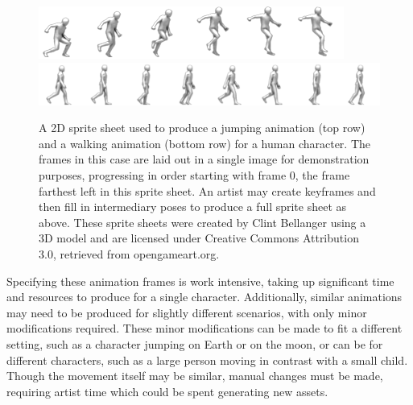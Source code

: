 \begin{figure}[htp]
    \centering
    \includegraphics[width=\textwidth]{images/sprite_example/platformer_sprites_jump.png}
    \includegraphics[width=\textwidth]{images/sprite_example/platformer_sprites_walk.png}
    \caption[Example of a 2D Sprite Animation]{A 2D sprite sheet used to produce a jumping animation (top row) and a walking animation (bottom row) for a human character.  The frames in this case are laid out in a single image for demonstration purposes, progressing in order starting with frame 0, the frame farthest left in this sprite sheet.  An artist may create keyframes and then fill in intermediary poses to produce a full sprite sheet as above.  These sprite sheets were created by Clint Bellanger using a 3D model and are licensed under Creative Commons Attribution 3.0, retrieved from opengameart.org.}
    \label{fig:sprite_sheet}
\end{figure}


Specifying these animation frames is work intensive, taking up significant time and resources to produce for a single character.  Additionally, similar animations may need to be produced for slightly different scenarios, with only minor modifications required.  These minor modifications can be made to fit a different setting, such as a character jumping on Earth or on the moon, or can be for different characters, such as a large person moving in contrast with a small child.  Though the movement itself may be similar, manual changes must be made, requiring artist time which could be spent generating new assets.  

